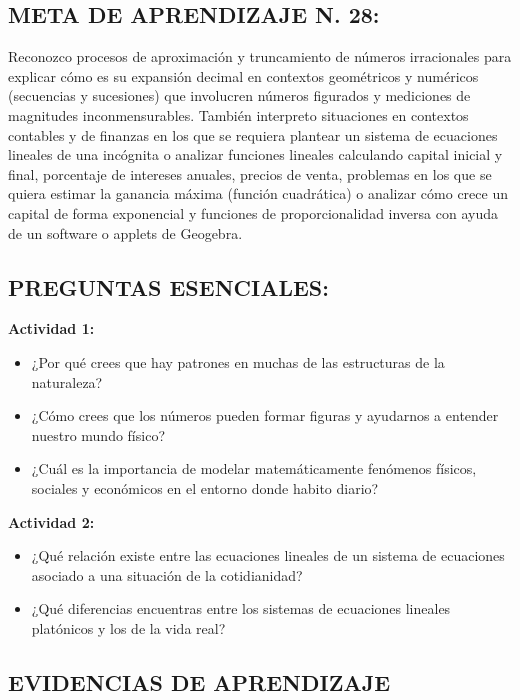 \documentclass[12pt,a4paper]{article}
\begin{document}
\subsection*{META DE APRENDIZAJE N. 28:}

Reconozco procesos de aproximación y truncamiento de números irracionales para explicar cómo es su expansión decimal en contextos geométricos y numéricos (secuencias y sucesiones) que involucren números figurados y mediciones de magnitudes inconmensurables. También interpreto situaciones en contextos contables y de finanzas en los que se requiera plantear un sistema de ecuaciones lineales de una incógnita o analizar funciones lineales calculando capital inicial y final, porcentaje de intereses anuales, precios de venta, problemas en los que se quiera estimar la ganancia máxima (función cuadrática) o analizar cómo crece un capital de forma exponencial y funciones de proporcionalidad inversa con ayuda de un software o applets de Geogebra.

\subsection*{PREGUNTAS ESENCIALES:}

\textbf{Actividad 1:}
\begin{itemize}
    \item ¿Por qué crees que hay patrones en muchas de las estructuras de la naturaleza?
    \item ¿Cómo crees que los números pueden formar figuras y ayudarnos a entender nuestro mundo físico?
    \item ¿Cuál es la importancia de modelar matemáticamente fenómenos físicos, sociales y económicos en el entorno donde habito diario?
\end{itemize}

\textbf{Actividad 2:}
\begin{itemize}
    \item ¿Qué relación existe entre las ecuaciones lineales de un sistema de ecuaciones asociado a una situación de la cotidianidad?
    \item ¿Qué diferencias encuentras entre los sistemas de ecuaciones lineales platónicos y los de la vida real?
\end{itemize}

\newpage

\subsection*{EVIDENCIAS DE APRENDIZAJE}
\end{document}
